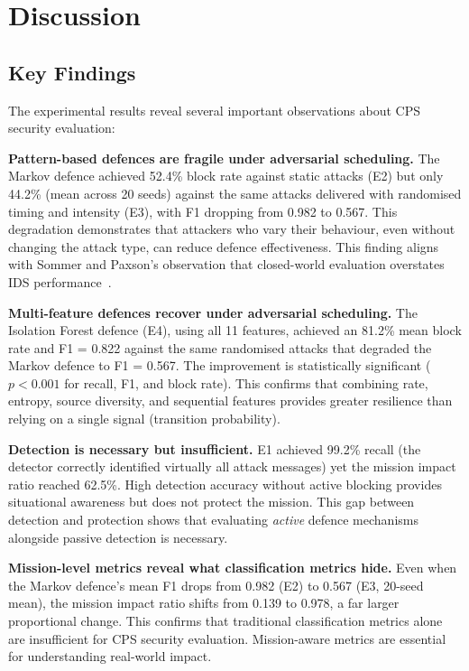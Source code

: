 \section{Discussion} \label{sec:discussion}

\subsection{Key Findings}

The experimental results reveal several important observations about CPS security evaluation:

\textbf{Pattern-based defences are fragile under adversarial scheduling.}
The Markov defence achieved 52.4\% block rate against static attacks (E2) but only 44.2\% (mean across 20 seeds) against the same attacks delivered with randomised timing and intensity (E3), with F1 dropping from 0.982 to 0.567.
This degradation demonstrates that attackers who vary their behaviour, even without changing the attack type, can reduce defence effectiveness.
This finding aligns with Sommer and Paxson's observation that closed-world evaluation overstates IDS performance~\cite{sommer2010closedworld}.

\textbf{Multi-feature defences recover under adversarial scheduling.}
The Isolation Forest defence (E4), using all 11 features, achieved an 81.2\% mean block rate and F1 = 0.822 against the same randomised attacks that degraded the Markov defence to F1 = 0.567.
The improvement is statistically significant ($p < 0.001$ for recall, F1, and block rate).
This confirms that combining rate, entropy, source diversity, and sequential features provides greater resilience than relying on a single signal (transition probability).

\textbf{Detection is necessary but insufficient.}
E1 achieved 99.2\% recall (the detector correctly identified virtually all attack messages) yet the mission impact ratio reached 62.5\%.
High detection accuracy without active blocking provides situational awareness but does not protect the mission.
This gap between detection and protection shows that evaluating \emph{active} defence mechanisms alongside passive detection is necessary.

\textbf{Mission-level metrics reveal what classification metrics hide.}
Even when the Markov defence's mean F1 drops from 0.982 (E2) to 0.567 (E3, 20-seed mean), the mission impact ratio shifts from 0.139 to 0.978, a far larger proportional change.
This confirms that traditional classification metrics alone are insufficient for CPS security evaluation. Mission-aware metrics are essential for understanding real-world impact.

